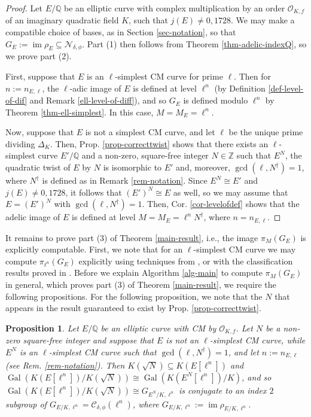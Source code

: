 \documentclass[11pt]{amsart}
\newtheorem{proposition}[defn]{Proposition}
\theoremstyle{definition}
\newcommand{\Q}{\mathbb{Q}}
\newcommand{\Z}{\mathbb{Z}}
\newcommand{\Of}{\mathcal{O}_{K,f}}
\newcommand{\Gal}{\operatorname{Gal}}
\DeclareMathOperator{\im}{im}  %
\begin{document}
\begin{proof}
     Let $E/\Q$ be an elliptic curve with complex multiplication by an order $\Of$ of an imaginary quadratic field $K$, such that $j(E)\neq 0,1728$. We may make a compatible choice of bases, as in Section \ref{sec-notation}, so that $G_E := \im \rho_{E} \subseteq \mathcal{N}_{\delta, \phi}$. Part (1) then follows from Theorem \ref{thm-adelic-indexQ}, so we prove part (2).
     
     First, suppose that $E$ is an $\ell$-simplest CM curve for prime $\ell$. Then for $n := n_{E, \ell}$, the $\ell$-adic image of $E$ is defined at level $\ell^{n}$ (by Definition \ref{def-level-of-dif} and Remark \ref{ell-level-of-diff}), and so $G_E$ is defined modulo $\ell^{n}$ by Theorem \ref{thm-ell-simplest}. In this case, $M = M_E = \ell^n$.
     
    
    Now, suppose that $E$ is not a simplest CM curve, and let $\ell$ be the unique prime dividing $\Delta_K$. Then, Prop. \ref{prop-correcttwist} shows that there exists an $\ell$-simplest curve $E'/\Q$ and a non-zero, square-free integer $N \in \Z$ such that $E^N$, the quadratic twist of $E$ by $N$ is isomorphic to $E'$ and, moreover, $\gcd(\ell, N^{\dagger}) = 1$, where $N^{\dagger}$ is defined as in Remark \ref{rem-notation}. Since $E^N \cong E'$ and $j(E)\neq 0,1728$, it follows that $(E')^N \cong E$ as well, so we may assume that $E=(E')^N$ with $\gcd(\ell,N^\dagger)=1$. Then, Cor. \ref{cor-levelofdef} shows that the adelic image of $E$ is defined at level $M = M_E = \ell^n N^\dagger$, where $n=n_{E,\ell}$.
\end{proof}

It remains to prove part (3) of Theorem \ref{main-result}, i.e.,  the image $\pi_M(G_E)$ is explicitly computable. First, we note that for an $\ell$-simplest CM curve we may compute $\pi_{\ell^n}(G_E)$ explicitly using techniques from \cite[Section 12]{elladic}, or with the classification results proved in \cite{modelspaper}. Before we explain Algorithm \ref{alg-main} to compute $\pi_M(G_E)$ in general, which proves part (3) of Theorem \ref{main-result}, we require the following propositions. For the following proposition, we note that the $N$ that appears in the result guaranteed to exist by Prop. \ref{prop-correcttwist}.

\begin{proposition}\label{prop-ellfixingN}
    Let $E/\Q$ be an elliptic curve with CM by $\Of$. Let $N$ be a non-zero square-free integer and suppose that $E$ is not an $\ell$-simplest CM curve, while $E^N$ is an $\ell$-simplest CM curve such that $\gcd(\ell, N^\dagger) = 1$, and let $n := n_{E, \ell}$ (see Rem. \ref{rem-notation}). Then $K(\sqrt{N}) \subseteq K(E[\ell^n])$ and $\Gal(K(E[\ell^n])/K(\sqrt{N})) \cong \Gal(K(E^N[\ell^n])/K)$, and so $\Gal(K(E[\ell^n])/K(\sqrt{N})) \cong G_{E^N/K, \ell^n}$ is conjugate to an index $2$ subgroup of $G_{E/K, \ell^n} = \mathcal{C}_{\delta, \phi}(\ell^n)$, where $G_{E/K, \ell^n} := \im \rho_{E/K, \ell^n}$.
\end{proposition}
\end{document}
